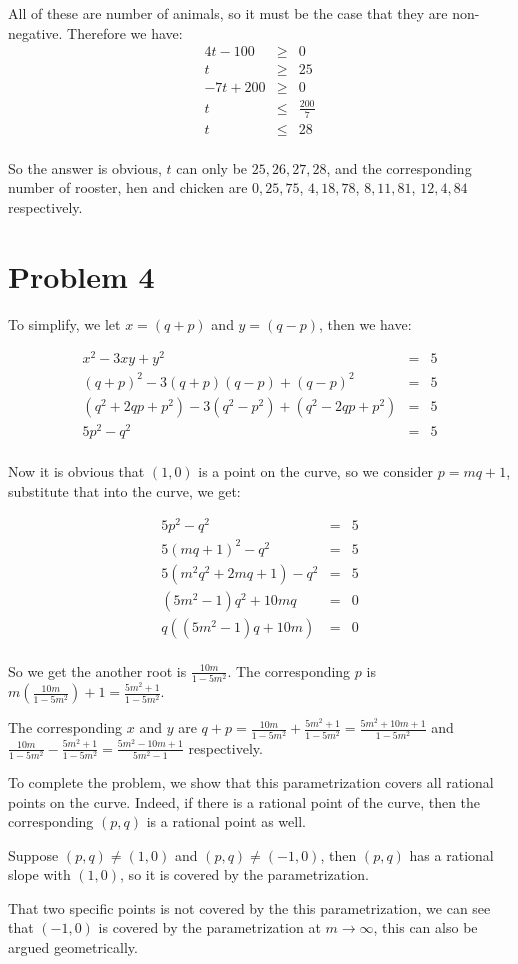 \documentclass{article}
\begin{document}
All of these are number of animals, so it must be the case that they are non-negative. Therefore we have:
\begin{eqnarray*}
   4t - 100 &\geq& 0 \\
          t &\geq& 25 \\
  -7t + 200 &\geq& 0 \\
          t &\leq& \frac{200}{7} \\
          t &\leq& 28 \\
\end{eqnarray*}

So the answer is obvious, $ t $ can only be $ 25, 26, 27, 28 $, and the corresponding number of rooster, hen and chicken are $ 0, 25, 75 $, $ 4, 18, 78 $, $ 8, 11, 81 $, $ 12, 4, 84 $ respectively.

\section*{Problem 4}
To simplify, we let $ x = (q + p) $ and $ y = (q - p) $, then we have:

\begin{eqnarray*}
  x^2 - 3xy + y^2 &=& 5 \\
  (q+p)^2 - 3(q+p)(q-p) + (q-p)^2 &=& 5 \\
  (q^2 + 2qp + p^2) - 3(q^2 - p^2) + (q^2 - 2qp + p^2) &=& 5 \\
  5p^2 - q^2 &=& 5 \\
\end{eqnarray*}

Now it is obvious that $ (1, 0) $ is a point on the curve, so we consider $ p = mq + 1 $, substitute that into the curve, we get:

\begin{eqnarray*}
  5p^2 - q^2 &=& 5 \\
  5(mq+1)^2 - q^2 &=& 5 \\
  5(m^2q^2 +2mq + 1) - q^2 &=& 5 \\
  (5m^2 - 1)q^2 + 10mq &=& 0 \\
  q((5m^2 - 1)q + 10m) &=& 0 \\
\end{eqnarray*}

So we get the another root is $ \frac{10m}{1 - 5m^2} $. The corresponding $ p $ is $ m\left(\frac{10m}{1 - 5m^2}\right) + 1 = \frac{5m^2 + 1}{1 - 5m^2} $.

The corresponding $ x $ and $ y $ are $ q + p = \frac{10m}{1 - 5m^2} + \frac{5m^2 + 1}{1 - 5m^2}  = \frac{5m^2 + 10m + 1}{1 - 5m^2} $ and $ \frac{10m}{1 - 5m^2} - \frac{5m^2 + 1}{1 - 5m^2} = \frac{5m^2 - 10m + 1}{5m^2 - 1} $ respectively.

To complete the problem, we show that this parametrization covers all rational points on the curve. Indeed, if there is a rational point of the curve, then the corresponding $ (p, q) $ is a rational point as well.

Suppose $ (p, q) \ne (1, 0) $ and $ (p, q) \ne (-1, 0) $, then $ (p, q) $ has a rational slope with $ (1, 0) $, so it is covered by the parametrization.

That two specific points is not covered by the this parametrization, we can see that $ (-1, 0) $ is covered by the parametrization at $ m \to \infty $, this can also be argued geometrically.
\end{document}
